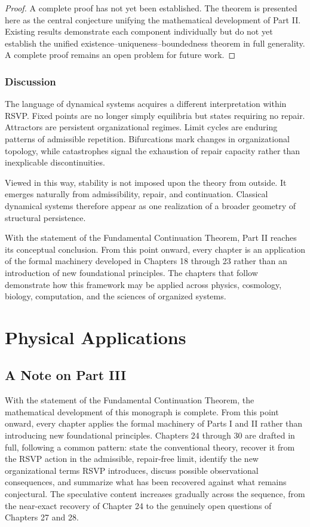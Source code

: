 \documentclass[11pt,oneside]{book}
\numberwithin{equation}{chapter}
\theoremstyle{definition}
\theoremstyle{plain}
\begin{document}
\begin{proof}
A complete proof has not yet been established. The theorem is presented
here as the central conjecture unifying the mathematical development of
Part II. Existing results demonstrate each component individually but do
not yet establish the unified existence--uniqueness--boundedness theorem in
full generality. A complete proof remains an open problem for future work.
\end{proof}

\section{Discussion}

The language of dynamical systems acquires a different interpretation within
RSVP. Fixed points are no longer simply equilibria but states requiring no
repair. Attractors are persistent organizational regimes. Limit cycles are
enduring patterns of admissible repetition. Bifurcations mark changes in
organizational topology, while catastrophes signal the exhaustion of repair
capacity rather than inexplicable discontinuities.

Viewed in this way, stability is not imposed upon the theory from outside.
It emerges naturally from admissibility, repair, and continuation. Classical
dynamical systems therefore appear as one realization of a broader geometry
of structural persistence.

With the statement of the Fundamental Continuation Theorem, Part II reaches
its conceptual conclusion. From this point onward, every chapter is an
application of the formal machinery developed in Chapters 18 through 23
rather than an introduction of new foundational principles. The chapters
that follow demonstrate how this framework may be applied across physics,
cosmology, biology, computation, and the sciences of organized systems.

\part{Physical Applications}

\chapter*{A Note on Part III}

With the statement of the Fundamental Continuation Theorem, the mathematical development of this monograph is complete. From this point onward, every chapter applies the formal machinery of Parts I and II rather than introducing new foundational principles. Chapters 24 through 30 are drafted in full, following a common pattern: state the conventional theory, recover it from the RSVP action in the admissible, repair-free limit, identify the new organizational terms RSVP introduces, discuss possible observational consequences, and summarize what has been recovered against what remains conjectural. The speculative content increases gradually across the sequence, from the near-exact recovery of Chapter 24 to the genuinely open questions of Chapters 27 and 28.
\end{document}
